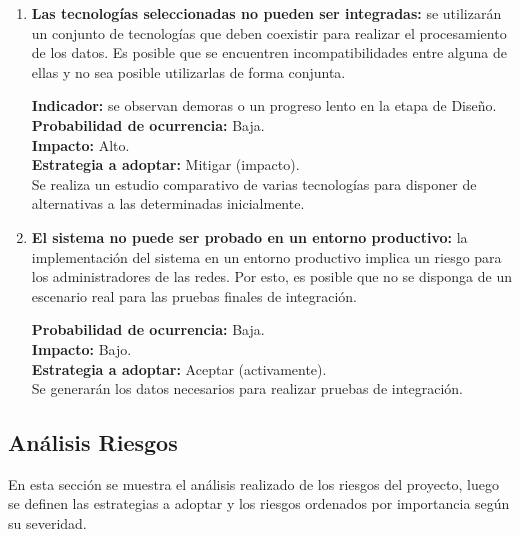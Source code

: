 \begin{enumerate}
\item \textbf{Las tecnologías seleccionadas no pueden ser integradas:} se utilizarán un conjunto de tecnologías que deben coexistir para realizar el procesamiento de los datos. Es posible que se encuentren incompatibilidades entre alguna de ellas y no sea posible utilizarlas de forma conjunta.

\textbf{Indicador:} se observan demoras o un progreso lento en la etapa de Diseño. \\
\textbf{Probabilidad de ocurrencia:} Baja. \\
\textbf{Impacto:} Alto. \\
\textbf{Estrategia a adoptar:} Mitigar (impacto). \\
Se realiza un estudio comparativo de varias tecnologías para disponer de alternativas a las determinadas inicialmente.

\item \textbf{El sistema no puede ser probado en un entorno productivo:} la implementación del sistema en un entorno productivo implica un riesgo para los administradores de las redes. Por esto, es posible que no se disponga de un escenario real para las pruebas finales de integración.

\textbf{Probabilidad de ocurrencia:} Baja. \\
\textbf{Impacto:} Bajo. \\
\textbf{Estrategia a adoptar:} Aceptar (activamente). \\
Se generarán los datos necesarios para realizar pruebas de integración.

\end{enumerate}

\begin{center}

\end{center}

\subsection*{Análisis Riesgos}
En esta sección se muestra el análisis realizado de los riesgos del proyecto, luego se definen las estrategias a adoptar y los riesgos ordenados por importancia según su severidad.

